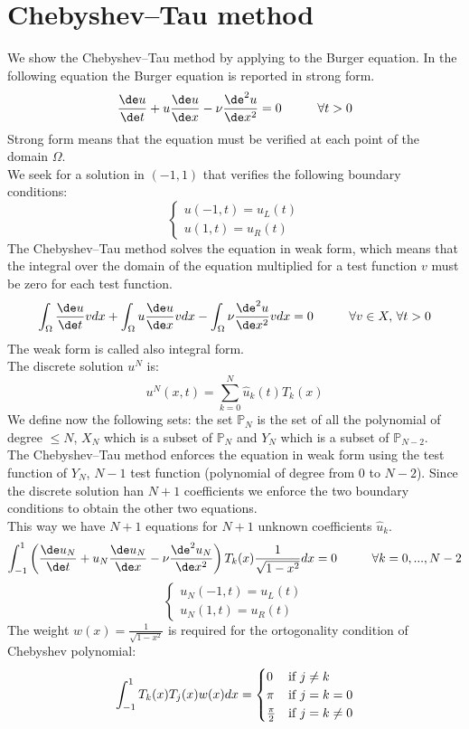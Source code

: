 \chapter{Chebyshev--Tau method}
We show the Chebyshev--Tau method by applying to the Burger equation. In the following equation the Burger equation is reported in strong form.
\begin{equation}
\frac{\de u}{\de t}+u\frac{\de u}{\de x}-\nu \frac{\de^2 u}{\de x^2}=0\hspace{1cm}  \forall t>0
\end{equation}
Strong form means that the equation must be verified at each point of the domain $\Omega$.\\
We seek for a solution in $(-1,1)$ that verifies the following boundary conditions:
\[
\begin{cases}
u(-1,t)=u_L(t)\\
u(1,t)=u_R(t)
\end{cases}
\]
The Chebyshev--Tau method solves the equation in weak form, which means that the integral over the domain of the equation multiplied for a test function $v$ must be zero for each test function.
\begin{equation}
\int_\Omega \frac{\de u}{\de t}vdx+\int_\Omega u\frac{\de u}{\de x}vdx-\int_\Omega\nu\frac{\de^2 u}{\de x^2}vdx=0  \hspace{1cm}  \forall v\in X,\,\forall t>0
\end{equation}
The weak form is called also integral form.\\
The discrete solution $u^N$ is:
\[
u^N(x,t)=\sum_{k=0}^N\hat u_k(t)T_k(x)
\]
We define now the following sets: the set $\mathbb{P}_N$ is the set of all the polynomial of degree $\leq N$, $X_N$ which is a subset of $\mathbb{P}_N$ and $Y_N$ which is a subset of $\mathbb{P}_{N-2}$. \\
The Chebyshev--Tau method enforces the equation in weak form using the test function of $Y_N$, $N-1$ test function (polynomial of degree from 0 to $N-2$). Since the discrete solution han $N+1$ coefficients we enforce the two boundary conditions to obtain the other two equations.\\
This way we have $N+1$ equations for $N+1$ unknown coefficients $\hat u_k$.
\[
\int_{-1}^{1}\left( \frac{\de u_N}{\de t}+u_N\frac{\de u_N}{\de x}-\nu\frac{\de^2u_N}{\de x^2}  \right)T_k(x)\frac{1}{\sqrt{1-x^2}}dx=0  \hspace{1cm}  \forall k=0,...,N-2
\]
\[
\begin{cases}
u_N(-1,t)=u_L(t)\\
u_N(1,t)=u_R(t)
\end{cases}
\]
The weight $w(x)=\frac{1}{\sqrt{1-x^2}}$ is required for the ortogonality condition of Chebyshev polynomial:
\[
\int_{-1}^1 T_k(x)T_j(x)w(x)dx=
\begin{cases}
0 &\textnormal{if } j\neq k\\
\pi & \textnormal{if } j=k=0\\
\frac{\pi}{2} & \textnormal{if } j=k\neq0
\end{cases}
\]

